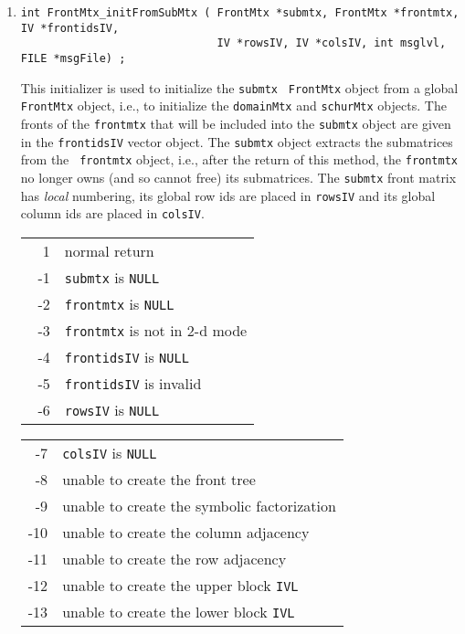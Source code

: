 \begin{enumerate}
\begin{center}
\begin{tabular}{rl}
\end{tabular}
\end{center}
\item
\begin{verbatim}
int FrontMtx_initFromSubMtx ( FrontMtx *submtx, FrontMtx *frontmtx, IV *frontidsIV,
                              IV *rowsIV, IV *colsIV, int msglvl, FILE *msgFile) ;
\end{verbatim}
This initializer is used to initialize the {\tt submtx} {\tt
FrontMtx} object from a global {\tt FrontMtx} object,
i.e., to initialize the {\tt domainMtx} and {\tt schurMtx} objects.
The fronts of the {\tt frontmtx} that will be included into the
{\tt submtx} object are given in the {\tt frontidsIV} vector object.
The {\tt submtx} object extracts the submatrices from the {\tt
frontmtx} object, i.e., after the return of this method,
the {\tt frontmtx} no longer owns (and so cannot free) its
submatrices.
The {\tt submtx} front matrix has {\it local} numbering, 
its global row ids are placed in {\tt rowsIV} and 
its global column ids are placed in {\tt colsIV}.
\par {}
\begin{center}
\begin{tabular}{rl}
~~1 & normal return \\
~-1 & {\tt submtx} is {\tt NULL} \\
~-2 & {\tt frontmtx} is {\tt NULL} \\
~-3 & {\tt frontmtx} is not in 2-d mode \\
~-4 & {\tt frontidsIV} is {\tt NULL} \\
~-5 & {\tt frontidsIV} is invalid \\
~-6 & {\tt rowsIV} is {\tt NULL} \\
\end{tabular}
\quad
\begin{tabular}{rl}
~-7 & {\tt colsIV} is {\tt NULL} \\
~-8 & unable to create the front tree \\
~-9 & unable to create the symbolic factorization \\
-10 & unable to create the column adjacency  \\
-11 & unable to create the row adjacency  \\
-12 & unable to create the upper block {\tt IVL}  \\
-13 & unable to create the lower block {\tt IVL}  \\
\end{tabular}
\end{center}
\end{enumerate}
\par
\par
